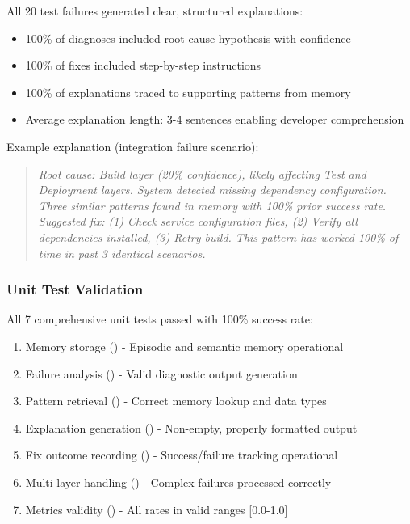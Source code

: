 \documentclass[11pt]{article}
\begin{document}
All 20 test failures generated clear, structured explanations:

\begin{itemize}
    \item 100\% of diagnoses included root cause hypothesis with confidence
    \item 100\% of fixes included step-by-step instructions
    \item 100\% of explanations traced to supporting patterns from memory
    \item Average explanation length: 3-4 sentences enabling developer comprehension
\end{itemize}

Example explanation (integration failure scenario):
\begin{quote}
\textit{Root cause: Build layer (20\% confidence), likely affecting Test and Deployment layers. System detected missing dependency configuration. Three similar patterns found in memory with 100\% prior success rate. Suggested fix: (1) Check service configuration files, (2) Verify all dependencies installed, (3) Retry build. This pattern has worked 100\% of time in past 3 identical scenarios.}
\end{quote}

\subsubsection{Unit Test Validation}

All 7 comprehensive unit tests passed with 100\% success rate:

\begin{enumerate}
    \item Memory storage (\checkmark) - Episodic and semantic memory operational
    \item Failure analysis (\checkmark) - Valid diagnostic output generation
    \item Pattern retrieval (\checkmark) - Correct memory lookup and data types
    \item Explanation generation (\checkmark) - Non-empty, properly formatted output
    \item Fix outcome recording (\checkmark) - Success/failure tracking operational
    \item Multi-layer handling (\checkmark) - Complex failures processed correctly
    \item Metrics validity (\checkmark) - All rates in valid ranges [0.0-1.0]
\end{enumerate}
\end{document}
